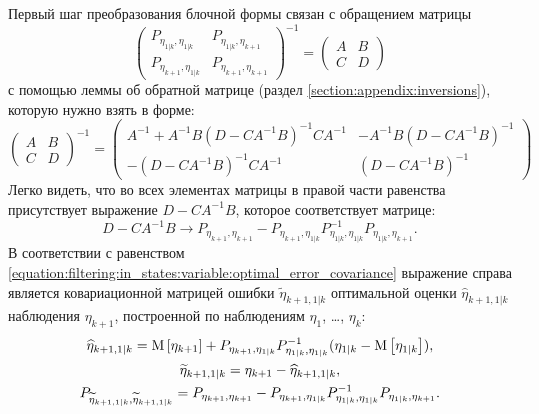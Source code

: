Первый шаг преобразования блочной формы связан с обращением матрицы
$$
	\begin{pmatrix}
		P_{\eta_{1|k}, \eta_{1|k}} & P_{\eta_{1|k}, \eta_{k+1}} \\
		P_{\eta_{k+1}, \eta_{1|k}} & P_{\eta_{k+1}, \eta_{k+1}}
	\end{pmatrix}^{-1}
	=
	\begin{pmatrix}
		A & B \\
		C & D
	\end{pmatrix}
$$
с помощью леммы об обратной матрице (раздел \ref{section:appendix:inversions}), которую нужно взять в форме:
\begin{equation} \label{equation:filtering:in_states:process:inversion_lemma}
	\begin{pmatrix}
		A & B \\
		C & D
	\end{pmatrix}^{-1}
	=
	\begin{pmatrix}
		A^{-1} + A^{-1} B \left ( D - C A^{-1} B \right )^{-1} C A^{-1} & - A^{-1} B \left ( D - C A^{-1} B \right )^{-1} \\
		- \left ( D - C A^{-1} B \right )^{-1} C A^{-1}                             & \left ( D - C A^{-1} B \right )^{-1}
	\end{pmatrix}
\end{equation}
Легко видеть, что во всех элементах матрицы в правой части равенства присутствует выражение $D - C A^{-1} B$, которое соответствует матрице:
$$
	D - C A^{-1} B
	\rightarrow
	P_{\eta_{k+1}, \eta_{k+1}} - P_{\eta_{k+1}, \eta_{1|k}} P_{\eta_{1|k},\eta_{1|k}}^{-1} P_{\eta_{1|k}, \eta_{k+1}}
	.
$$
В соответствии с равенством \eqref{equation:filtering:in_states:variable:optimal_error_covariance} выражение справа является ковариационной матрицей ошибки
$\widetilde{\eta}_{k+1,1|k}$ оптимальной оценки $\widehat{\eta}_{k+1,1|k}$ наблюдения $\eta_{k+1}$, построенной по наблюдениям $\eta_1$, \dots, $\eta_k$:
\begin{gather}
	\widehat{\eta}_{k+1,1|k} = \mathrm{M} \left [ \eta_{k+1} \right ] + P_{\eta_{k+1},\eta_{1|k}}P_{\eta_{1|k},\eta_{1|k}}^{-1} ( \eta_{1|k} - \mathrm{M} \left [ \eta_{1|k} \right ] ) ,
		\label{equation:filtering:in_states:process:observation_prediction} \\
	\widetilde{\eta}_{k+1,1|k} = \eta_{k+1} - \widehat{\eta}_{k+1,1|k} ,
		\notag \\
	P_{\widetilde{\eta}_{k+1, 1|k}, \widetilde{\eta}_{k+1, 1|k}} = P_{\eta_{k+1}, \eta_{k+1}} - P_{\eta_{k+1}, \eta_{1|k}} P_{\eta_{1|k},\eta_{1|k}}^{-1} P_{\eta_{1|k}, \eta_{k+1}} .
		\notag
\end{gather}
